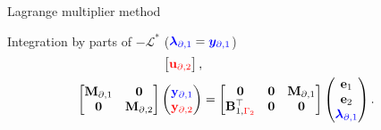 \documentclass[aspectratio=169]{ISAE-Beamer}
\begin{document}
\begin{frame}{Lagrange multiplier method}
{\begin{exampleblock}{Integration by parts of $-\mathcal{L}^*$ ($\textcolor{blue}{\bm{\lambda}_{\partial, 1}}=\textcolor{blue}{\bm{y}_{\partial, 1}}$) }
\begin{equation*}
\begin{aligned}
\begin{bmatrix}
						\textcolor{red}{\mathbf{u}_{\partial, 2}} \\
					\end{bmatrix}, \\
					\begin{bmatrix}
						\mathbf{M}_{\partial, 1} & \mathbf{0} \\
						\mathbf{0} & \mathbf{M}_{\partial, 2} \\
					\end{bmatrix}
					\begin{pmatrix}
						\textcolor{blue}{\mathbf{y}_{\partial, 1}} \\
						\textcolor{red}{\mathbf{y}_{\partial, 2}} \\
					\end{pmatrix}
					&= \begin{bmatrix}
						\mathbf{0} & \mathbf{0} & \mathbf{M}_{\partial, 1} \\
						\mathbf{B}_{1, \textcolor{red}{\Gamma_2}}^\top & \mathbf{0} & \mathbf{0} \\
					\end{bmatrix}\begin{pmatrix}
						\mathbf{e}_{1} \\
						\mathbf{e}_{2} \\
						\textcolor{blue}{\bm{\lambda}_{\partial, 1}} \\
					\end{pmatrix}.
				\end{aligned}
			\end{equation*}
		\end{exampleblock}
	}
	

\end{frame}
\end{document}
